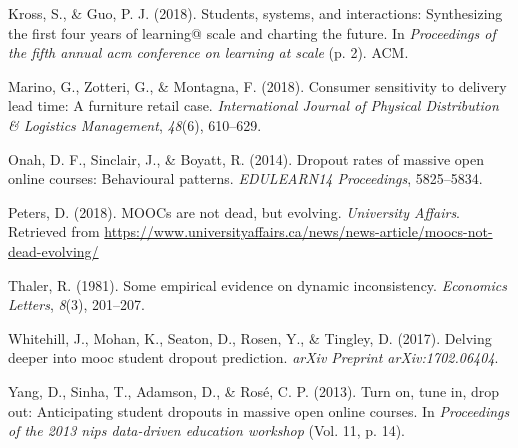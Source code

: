 \documentclass[12pt,]{article}
\begin{document}
\hypertarget{ref-kross2018students}{}
Kross, S., \& Guo, P. J. (2018). Students, systems, and interactions:
Synthesizing the first four years of learning@ scale and charting the
future. In \emph{Proceedings of the fifth annual acm conference on
learning at scale} (p. 2). ACM.

\hypertarget{ref-marino2018consumer}{}
Marino, G., Zotteri, G., \& Montagna, F. (2018). Consumer sensitivity to
delivery lead time: A furniture retail case. \emph{International Journal
of Physical Distribution \& Logistics Management}, \emph{48}(6),
610--629.

\hypertarget{ref-onah2014dropout}{}
Onah, D. F., Sinclair, J., \& Boyatt, R. (2014). Dropout rates of
massive open online courses: Behavioural patterns. \emph{EDULEARN14
Proceedings}, 5825--5834.

\hypertarget{ref-peters2018moocsevolved}{}
Peters, D. (2018). MOOCs are not dead, but evolving. \emph{University
Affairs}. Retrieved from
\url{https://www.universityaffairs.ca/news/news-article/moocs-not-dead-evolving/}

\hypertarget{ref-thaler1981some}{}
Thaler, R. (1981). Some empirical evidence on dynamic inconsistency.
\emph{Economics Letters}, \emph{8}(3), 201--207.

\hypertarget{ref-whitehill2017delving}{}
Whitehill, J., Mohan, K., Seaton, D., Rosen, Y., \& Tingley, D. (2017).
Delving deeper into mooc student dropout prediction. \emph{arXiv
Preprint arXiv:1702.06404}.

\hypertarget{ref-yang2013turn}{}
Yang, D., Sinha, T., Adamson, D., \& Rosé, C. P. (2013). Turn on, tune
in, drop out: Anticipating student dropouts in massive open online
courses. In \emph{Proceedings of the 2013 nips data-driven education
workshop} (Vol. 11, p. 14).
\end{document}
